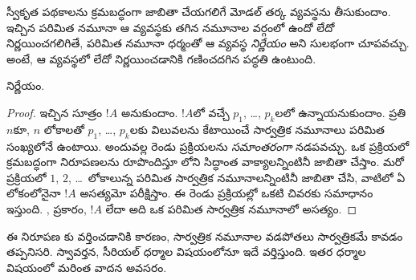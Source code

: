 \documentclass[../../../include/open-logic-section]{subfiles}
\begin{document}

స్వీకృత పథకాలను క్రమబద్ధంగా జాబితా చేయగలిగే మోడల్ తర్క
వ్యవస్థను తీసుకుందాం. ఇచ్చిన పరిమిత నమూనా ఆ వ్యవస్థకు తగిన
నమూనాల వర్గంలో ఉందో లేదో నిర్ణయించగలిగితే, పరిమిత నమూనా
ధర్మంతో ఆ వ్యవస్థ \emph{నిర్ణేయం} అని సులభంగా చూపవచ్చు.
అంటే,  ఆ వ్యవస్థలో
 లేదో
నిర్ణయించడానికి గణించదగిన పద్ధతి ఉంటుంది.

\begin{thm}
   నిర్ణేయం.
\end{thm}

\begin{proof}
  ఇచ్చిన సూత్రం $!A$ అనుకుందాం. $!A$లో వచ్చే
  $p_1$, \dots, $p_k$లలో ఉన్నాయనుకుందాం.
  ప్రతి $n$కూ, $n$ లోకాలతో $p_1$, \dots, $p_k$లకు
  విలువలను కేటాయించే సార్వత్రిక నమూనాలు పరిమిత
  సంఖ్యలోనే ఉంటాయి. అందువల్ల రెండు ప్రక్రియలను
  \emph{సమాంతరంగా} నడపవచ్చు. ఒక ప్రక్రియలో క్రమబద్ధంగా
  నిరూపణలను రూపొందిస్తూ లోని సిద్ధాంత
  వాక్యాలన్నింటినీ జాబితా చేస్తాం. మరో ప్రక్రియలో
  $1$, $2$, \dots~లోకాలున్న పరిమిత
  సార్వత్రిక నమూనాలన్నింటినీ జాబితా చేసి,
  వాటిలో ఏ లోకంలోనైనా $!A$ అసత్యమో పరీక్షిస్తాం.
  ఈ రెండు ప్రక్రియల్లో ఒకటి చివరకు సమాధానం ఇస్తుంది. ,
   ప్రకారం, $!A$
   లేదా అది
  ఒక పరిమిత సార్వత్రిక నమూనాలో అసత్యం.
\end{proof}

ఈ నిరూపణ కు వర్తించడానికి కారణం,
సార్వత్రిక నమూనాల వడపోతలు సార్వత్రికమే
కావడం తప్పనిసరి. స్వావర్తన, సీరియల్ ధర్మాల విషయంలోనూ
ఇదే వర్తిస్తుంది. ఇతర ధర్మాల విషయంలో మరింత వాదన అవసరం.
\end{document}
